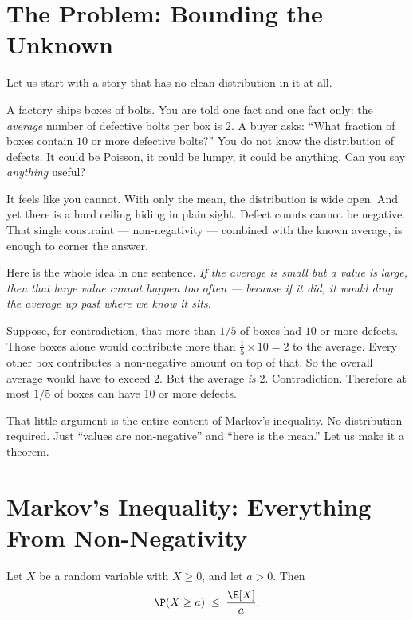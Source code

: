 \chapterline

\section{The Problem: Bounding the Unknown}
\label{ch19:problem}

Let us start with a story that has no clean distribution in it at all.

A factory ships boxes of bolts. You are told one fact and one fact only: the
\emph{average} number of defective bolts per box is $2$. A buyer asks: ``What
fraction of boxes contain $10$ or more defective bolts?'' You do not know the
distribution of defects. It could be Poisson, it could be lumpy, it could be
anything. Can you say \emph{anything} useful?

It feels like you cannot. With only the mean, the distribution is wide open.
And yet there is a hard ceiling hiding in plain sight. Defect counts cannot be
negative. That single constraint --- non-negativity --- combined with the
known average, is enough to corner the answer.

\begin{intuitionbox}
Here is the whole idea in one sentence. \emph{If the average is small but a
value is large, then that large value cannot happen too often --- because if
it did, it would drag the average up past where we know it sits.}

Suppose, for contradiction, that more than $1/5$ of boxes had $10$ or more
defects. Those boxes alone would contribute more than $\tfrac15 \times 10 = 2$
to the average. Every other box contributes a non-negative amount on top of
that. So the overall average would have to exceed $2$. But the average
\emph{is} $2$. Contradiction. Therefore at most $1/5$ of boxes can have $10$
or more defects.
\end{intuitionbox}

That little argument is the entire content of Markov's inequality. No
distribution required. Just ``values are non-negative'' and ``here is the
mean.'' Let us make it a theorem.

\section{Markov's Inequality: Everything From Non-Negativity}
\label{ch19:markov}

\begin{theorem}
\label{ch19:markov-thm}
Let $X$ be a random variable with $X \ge 0$, and let $a > 0$. Then
\[
  \P(X \ge a) \;\le\; \frac{\E[X]}{a}.
\]
\end{theorem}

